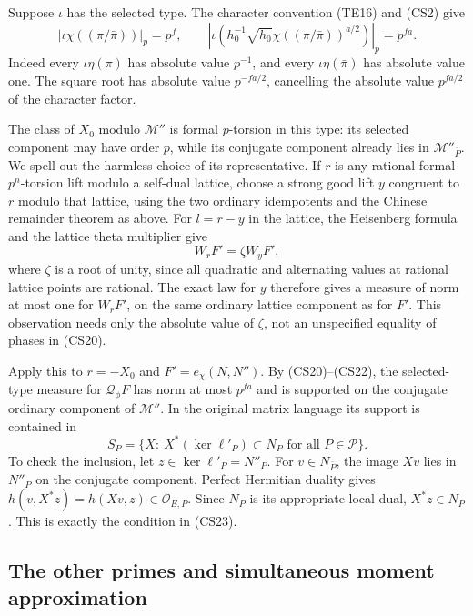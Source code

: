 Suppose $\iota$ has the selected type.  The character convention
(TE16) and (CS2) give
\[
 \left|\iota\chi((\pi/\bar\pi))\right|_p=p^f,\qquad
 \left|\iota\left(h_0^{-1}\sqrt{h_0}
                         \chi((\pi/\bar\pi))^{a/2}\right)\right|_p
                                                        =p^{fa}.
                                                               \tag{CS21}
\]
Indeed every $\iota\eta(\pi)$ has absolute value $p^{-1}$,
and every $\iota\eta(\bar\pi)$ has absolute value one.
The square root has absolute value $p^{-fa/2}$, cancelling
the absolute value $p^{fa/2}$ of the character factor.

The class of $X_0$ modulo $\mathcal M''$ is formal
$p$-torsion in this type: its selected component may have
order $p$, while its conjugate component already lies in
$\mathcal M''_{\bar P}$.  We spell out the harmless
choice of its representative.  If $r$ is any rational
formal $p^n$-torsion lift modulo a self-dual lattice, choose
a strong good lift $y$ congruent to $r$ modulo that lattice,
using the two ordinary idempotents and the Chinese remainder
theorem as above.  For $l=r-y$ in the lattice,
the Heisenberg formula and the lattice theta multiplier give
\[
                         W_rF'=\zeta W_yF',                 \tag{CS22}
\]
where $\zeta$ is a root of unity, since all quadratic and
alternating values at rational lattice points are rational.
The exact law for $y$ therefore gives a measure of norm
at most one for $W_rF'$, on the same ordinary lattice
component as for $F'$.  This observation needs only the
absolute value of $\zeta$, not an unspecified equality of
phases in (CS20).

Apply this to $r=-X_0$ and $F'=e_\chi(N,N'')$.
By (CS20)--(CS22), the selected-type measure for
$\mathcal Q_\phi F$ has norm at most $p^{fa}$ and is
supported on the conjugate ordinary component of
$\mathcal M''$.  In the original matrix language its
support is contained in
\[
 S_P=\{X:\ X^*(\ker\ell'_P)\subset N_P
                               \text{ for all }P\in\mathcal P\}.
                                                               \tag{CS23}
\]
To check the inclusion, let $z\in\ker\ell'_P=N''_P$.
For $v\in N_{\bar P}$, the image $Xv$ lies in $N''_{\bar P}$
on the conjugate component.  Perfect Hermitian duality
gives $h(v,X^*z)=h(Xv,z)\in\mathcal O_{E,P}$.
Since $N_P$ is its appropriate local dual, $X^*z\in N_P$.
This is exactly the condition in (CS23).

\subsection{The other primes and simultaneous moment approximation}

